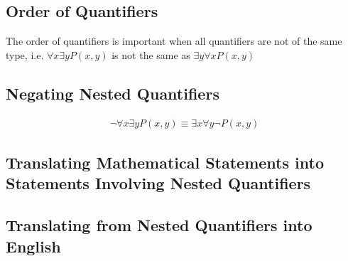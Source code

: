 \documentclass[12pt letter]{report}
\begin{document}
\subsection{Order of Quantifiers}

The order of quantifiers is important when all quantifiers are not of the same type, i.e. $\forall x \exists y P \left( x, y \right) $ is not the same as $\exists y \forall x P \left( x, y \right) $

\subsection{Negating Nested Quantifiers}

\begin{align*}
  \neg  \forall x \exists y P \left( x, y \right) \equiv \exists x \forall y \neg P \left( x, y \right) \tag*{
    By De Morgan's Law
  }
\end{align*}

\subsection{Translating Mathematical Statements into Statements Involving Nested Quantifiers}



\subsection{Translating from Nested Quantifiers into English}
\end{document}
